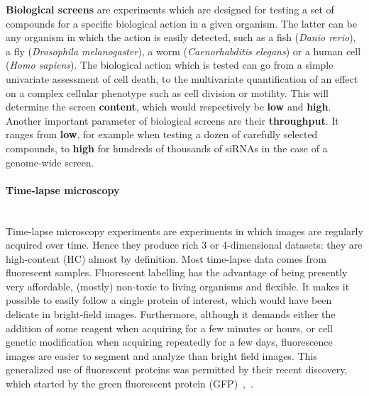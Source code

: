 \textbf{Biological screens} are experiments which are designed for testing a set of compounds for a specific biological action in a given organism. The latter can be any organism in which the action is easily detected, such as a fish (\textit{Danio rerio}), a fly (\textit{Drosophila melanogaster}), a worm (\textit{Caenorhabditis elegans}) or a human cell (\textit{Homo sapiens}). The biological action which is tested can go from a simple univariate assessment of cell death, to the multivariate quantification of an effect on a complex cellular phenotype such as cell division or motility. This will determine the screen \textbf{content}, which would respectively be \textbf{low} and \textbf{high}. Another important parameter of biological screens are their \textbf{throughput}. It ranges from \textbf{low}, for example when testing a dozen of carefully selected compounds, to \textbf{high} for hundreds of thousands of siRNAs in the case of a genome-wide screen. 

\paragraph{Time-lapse microscopy}~\\
Time-lapse microscopy experiments are experiments in which images are regularly acquired over time. Hence they produce rich 3 or 4-dimensional datasets: they are high-content (HC) almost by definition. Most time-lapse data comes from fluorescent samples. Fluorescent labelling has the advantage of being presently very affordable, (mostly) non-toxic to living organisms and flexible. It makes it possible to easily follow a single protein of interest, which would have been delicate in bright-field images. Furthermore, although it demands either the addition of some reagent when acquiring for a few minutes or hours, or cell genetic modification when acquiring repeatedly for a few days, fluorescence images are easier to segment and analyze than bright field images. This generalized use of fluorescent proteins was permitted by their recent discovery, which started by the green fluorescent protein (GFP)~\cite{pmid8303295},~\cite{pmid19575655}.

